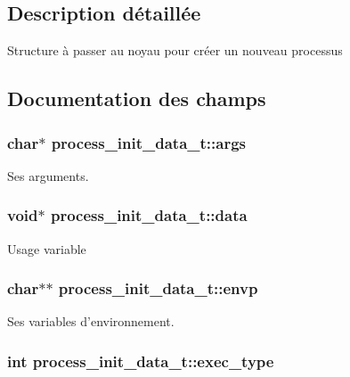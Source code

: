 \subsection{\-Description détaillée}
\-Structure à passer au noyau pour créer un nouveau processus 

\subsection{\-Documentation des champs}
\hypertarget{structprocess__init__data__t_a16d011771835f06e0bb3d5fd6115e13c}{
\subsubsection[{args}]{\setlength{\rightskip}{0pt plus 5cm}char$\ast$ {\bf process\-\_\-init\-\_\-data\-\_\-t\-::args}}}\label{structprocess__init__data__t_a16d011771835f06e0bb3d5fd6115e13c}
\-Ses arguments. \hypertarget{structprocess__init__data__t_ae950cc2a2cc04d1c00a71f70c2fde72c}{
\subsubsection[{data}]{\setlength{\rightskip}{0pt plus 5cm}void$\ast$ {\bf process\-\_\-init\-\_\-data\-\_\-t\-::data}}}\label{structprocess__init__data__t_ae950cc2a2cc04d1c00a71f70c2fde72c}
\-Usage variable \hypertarget{structprocess__init__data__t_a863d82fbd718f53164a520f67376eac2}{
\subsubsection[{envp}]{\setlength{\rightskip}{0pt plus 5cm}char$\ast$$\ast$ {\bf process\-\_\-init\-\_\-data\-\_\-t\-::envp}}}\label{structprocess__init__data__t_a863d82fbd718f53164a520f67376eac2}
\-Ses variables d'environnement. \hypertarget{structprocess__init__data__t_a1cda790f7d2446a04562094f09e358ab}{
\subsubsection[{exec\-\_\-type}]{\setlength{\rightskip}{0pt plus 5cm}int {\bf process\-\_\-init\-\_\-data\-\_\-t\-::exec\-\_\-type}}}\label{structprocess__init__data__t_a1cda790f7d2446a04562094f09e358ab}
